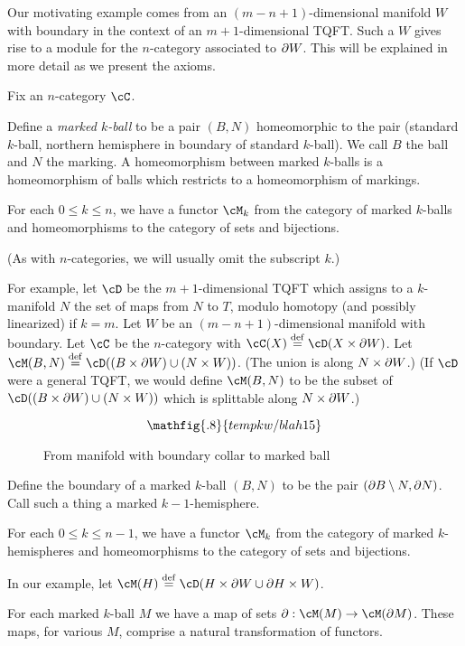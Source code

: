 Our motivating example comes from an $(m{-}n{+}1)$-dimensional manifold $W$ with boundary
in the context of an $m{+}1$-dimensional TQFT.
Such a $W$ gives rise to a module for the $n$-category associated to $\partial W$.
This will be explained in more detail as we present the axioms.

Fix an $n$-category $\cC$.

Define a {\it marked $k$-ball} to be a pair $(B, N)$ homeomorphic to the pair
(standard $k$-ball, northern hemisphere in boundary of standard $k$-ball).
We call $B$ the ball and $N$ the marking.
A homeomorphism between marked $k$-balls is a homeomorphism of balls which
restricts to a homeomorphism of markings.

{For each $0 \le k \le n$, we have a functor $\cM_k$ from 
the category of marked $k$-balls and 
homeomorphisms to the category of sets and bijections.}

(As with $n$-categories, we will usually omit the subscript $k$.)

For example, let $\cD$ be the $m{+}1$-dimensional TQFT which assigns to a $k$-manifold $N$ the set 
of maps from $N$ to $T$, modulo homotopy (and possibly linearized) if $k=m$.
Let $W$ be an $(m{-}n{+}1)$-dimensional manifold with boundary.
Let $\cC$ be the $n$-category with $\cC(X) \deq \cD(X\times \bd W)$.
Let $\cM(B, N) \deq \cD((B\times \bd W)\cup (N\times W))$.
(The union is along $N\times \partial W$.)
(If $\cD$ were a general TQFT, we would define $\cM(B, N)$ to be
the subset of $\cD((B\times \bd W)\cup (N\times W))$ which is splittable along $N\times \partial W$.)

\begin{figure}[!ht]
$$\mathfig{.8}{tempkw/blah15}$$
\caption{From manifold with boundary collar to marked ball}\label{blah15}\end{figure}

Define the boundary of a marked $k$-ball $(B, N)$ to be the pair $(\partial B \setminus N, \partial N)$.
Call such a thing a {marked $k{-}1$-hemisphere}.

{For each $0 \le k \le n-1$, we have a functor $\cM_k$ from 
the category of marked $k$-hemispheres and 
homeomorphisms to the category of sets and bijections.}

In our example, let $\cM(H) \deq \cD(H\times\bd W \cup \bd H\times W)$.

{For each marked $k$-ball $M$ we have a map of sets $\bd: \cM(M)\to \cM(\bd M)$.
These maps, for various $M$, comprise a natural transformation of functors.}

